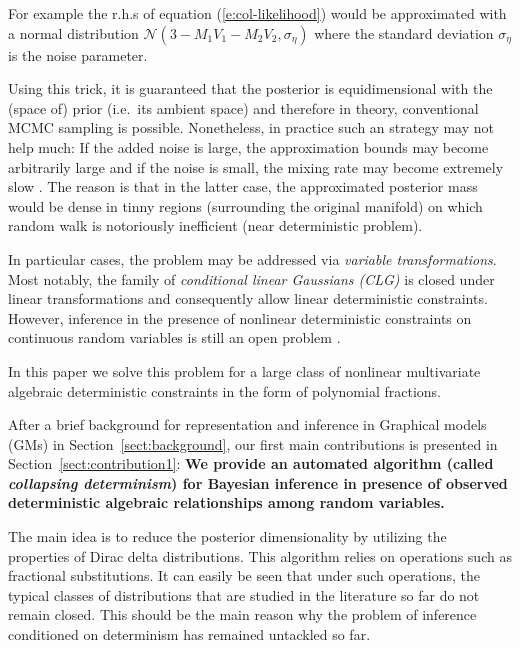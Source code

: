 \documentclass{article}
\begin{document}
For example the r.h.s of equation (\ref{e:col-likelihood}) would be 
approximated with a normal distribution
{\footnotesize $\mathcal{N}(3 - M_1 V_1 - M_2 V_2, \sigma_\eta)$}  
where the standard deviation $\sigma_\eta$ is the noise parameter.

Using this trick, it is guaranteed that the posterior is equidimensional with the (space of) prior (i.e.\ its ambient space) and therefore in theory, conventional MCMC sampling is possible.
Nonetheless, in practice such an strategy may not help much:
If the added noise is large, 
the approximation bounds may become arbitrarily large
and if the noise is small, 
the mixing rate may become extremely slow \cite{chin1987bayesian}. 
The reason is that in the latter case, 
 the approximated posterior mass would be dense in tinny regions (surrounding the original manifold) on which random walk
is notoriously inefficient (near deterministic problem).  

In particular cases, the problem may be addressed via 
\emph{variable transformations}.
Most notably, 
the family of \emph{conditional linear Gaussians (CLG)} \cite{lauritzen2001stable}
is closed under linear transformations and consequently
allow linear deterministic constraints.
However, inference in the presence of nonlinear deterministic constraints on continuous random variables is still an open problem \cite{li2013dynamic}.
 
In this paper we solve this problem for a large class of nonlinear multivariate algebraic deterministic constraints in the form of polynomial fractions. 

After a brief background for representation and inference in Graphical models (GMs) in Section~\ref{sect:background}, 
our first main contributions is presented in Section~\ref{sect:contribution1}:
{
\bf
We provide an automated algorithm (called \emph{collapsing determinism}) for Bayesian inference in 
presence of observed deterministic algebraic relationships among random variables.
}

The main idea is to reduce the posterior dimensionality by utilizing 
the properties of Dirac delta distributions. 
This algorithm relies on operations such as fractional substitutions. 
It can easily be seen that under such operations, the typical classes of distributions that are studied in the literature so far do not remain closed.
This should be the main reason why the problem of inference conditioned on determinism has remained {\color{green}untackled} so far. 
\end{document}
